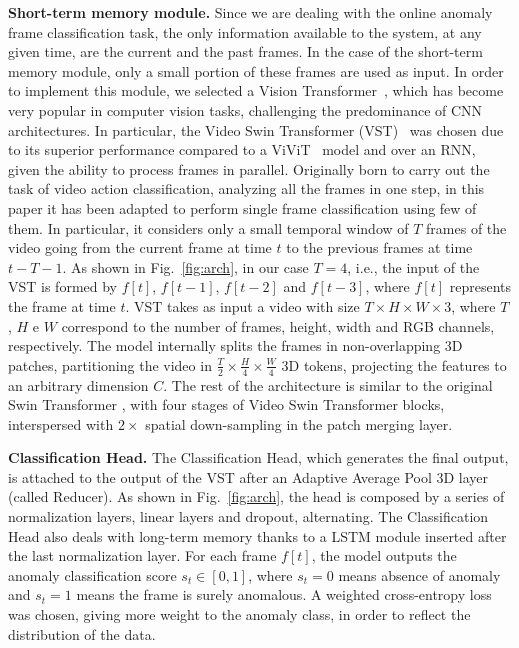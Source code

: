 \noindent\textbf{Short-term memory module.}
Since we are dealing with the online anomaly frame classification task, the only information available to the system, at any given time, are the current and the past frames.
In the case of the short-term memory module, only a small portion of these frames are used as input.
In order to implement this module, we selected a Vision Transformer~\cite{DBLP:conf/iclr/DosovitskiyB0WZ21}, which has become very popular in computer vision tasks, challenging the predominance of CNN architectures. 
In particular, the Video Swin Transformer (VST)~\cite{liu_video_2022} was chosen due to its superior performance compared to a ViViT~\cite{Arnab_2021_ICCV} model and over an RNN, given the ability to process frames in parallel.
Originally born to carry out the task of video action classification, analyzing all the frames in one step, in this paper it has been adapted to perform single frame classification using few of them.
In particular, it considers only a small temporal window of $T$ frames of the video going from the current frame at time $t$ to the previous frames at time $t-T-1$.
As shown in Fig.~\ref{fig:arch}, in our case $T=4$, i.e., the input of the VST is formed by $f[t]$, $f[t-1]$, $f[t-2]$ and $f[t-3]$, where $f[t]$ represents the frame at time $t$.
VST takes as input a video with size $T \times H \times W \times 3$, where $T$, $H$ e $W$ correspond to the number of frames, height, width and RGB channels, respectively.
The model internally splits the frames in non-overlapping 3D patches, partitioning the video in $\frac{T}{2} \times \frac{H}{4} \times \frac{W}{4}$ 3D tokens, projecting the features to an arbitrary dimension $C$.
The rest of the architecture is similar to the original Swin Transformer \cite{liu2021Swin}, with four stages of Video Swin Transformer blocks, interspersed with $2\times$ spatial down-sampling in the patch merging layer.

\noindent\textbf{Classification Head.}
The Classification Head, which generates the final output, is attached to the output of the VST after an Adaptive Average Pool 3D layer (called Reducer).
As shown in Fig.~\ref{fig:arch}, the head is composed by a series of normalization layers, linear layers and dropout, alternating. 
The Classification Head also deals with long-term memory thanks to a LSTM module inserted after the last normalization layer.
For each frame $f[t]$, the model outputs the anomaly classification score $s_t \in [0,1]$, where $s_t=0$ means absence of anomaly and $s_t=1$ means the frame is surely anomalous.
A weighted cross-entropy loss was chosen, giving more weight to the anomaly class, in order to reflect the distribution of the data.

